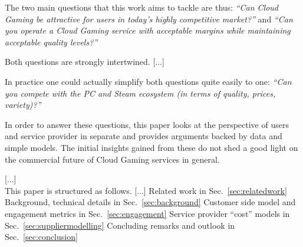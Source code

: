 The two main questions that this work aims to tackle are thus: \textit{``Can Cloud Gaming be attractive for users in today's highly competitive market?''} and \textit{``Can you operate a Cloud Gaming service with acceptable margins while maintaining acceptable quality levels?''}

Both questions are strongly intertwined. [...]

In practice one could actually simplify both questions quite easily to one: \textit{``Can you compete with the PC and Steam ecosystem (in terms of quality, prices, variety)?''}

In order to answer these questions, this paper looks at the perspective of users and service provider in separate and provides arguments backed by data and simple models. The initial insights gained from these do not shed a good light on the commercial future of Cloud Gaming services in general.

[...]
~\\
This paper is structured as follows. [...] 
Related work in Sec.~\ref{sec:relatedwork}
Background, technical details in Sec.~\ref{sec:background}
Customer side model and engagement metrics in Sec.~\ref{sec:engagement}
Service provider ``cost'' models in Sec.~\ref{sec:suppliermodelling}
Concluding remarks and outlook in Sec.~\ref{sec:conclusion}



